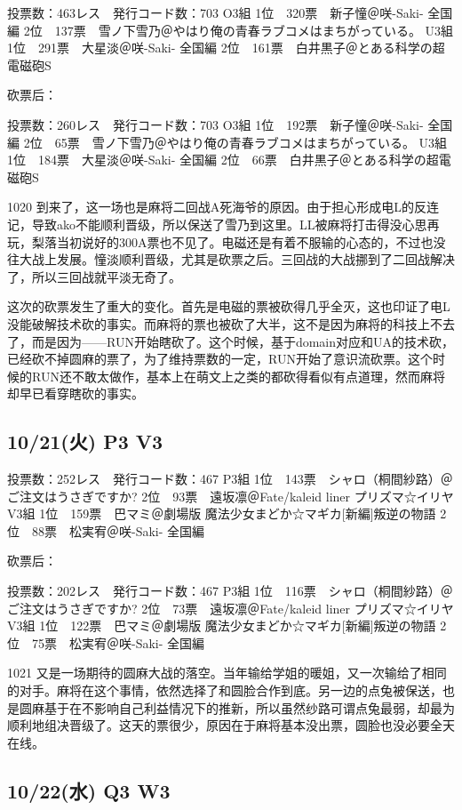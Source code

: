 	投票数：463レス　発行コード数：703
	O3組
	1位　320票　新子憧＠咲-Saki- 全国編
	2位　137票　雪ノ下雪乃＠やはり俺の青春ラブコメはまちがっている。
	U3組
	1位　291票　大星淡＠咲-Saki- 全国編
	2位　161票　白井黒子＠とある科学の超電磁砲S

砍票后：

	投票数：260レス　発行コード数：703
	O3組
	1位　192票　新子憧＠咲-Saki- 全国編
	2位　65票　雪ノ下雪乃＠やはり俺の青春ラブコメはまちがっている。
	U3組
	1位　184票　大星淡＠咲-Saki- 全国編
	2位　66票　白井黒子＠とある科学の超電磁砲S

1020 到来了，这一场也是麻将二回战A死海爷的原因。由于担心形成电L的反连记，导致ako不能顺利晋级，所以保送了雪乃到这里。LL被麻将打击得没心思再玩，梨落当初说好的300A票也不见了。电磁还是有着不服输的心态的，不过也没往大战上发展。憧淡顺利晋级，尤其是砍票之后。三回战的大战挪到了二回战解决了，所以三回战就平淡无奇了。

这次的砍票发生了重大的变化。首先是电磁的票被砍得几乎全灭，这也印证了电L没能破解技术砍的事实。而麻将的票也被砍了大半，这不是因为麻将的科技上不去了，而是因为——RUN开始瞎砍了。这个时候，基于domain对应和UA的技术砍，已经砍不掉圆麻的票了，为了维持票数的一定，RUN开始了意识流砍票。这个时候的RUN还不敢太做作，基本上在萌文上之类的都砍得看似有点道理，然而麻将却早已看穿瞎砍的事实。

\subsection{10/21(火) P3 V3}

	投票数：252レス　発行コード数：467
	P3組
	1位　143票　シャロ（桐間紗路）＠ご注文はうさぎですか?
	2位　93票　遠坂凛＠Fate/kaleid liner プリズマ☆イリヤ
	V3組
	1位　159票　巴マミ＠劇場版 魔法少女まどか☆マギカ[新編]叛逆の物語
	2位　88票　松実宥＠咲-Saki- 全国編

砍票后：

	投票数：202レス　発行コード数：467
	P3組
	1位　116票　シャロ（桐間紗路）＠ご注文はうさぎですか?
	2位　73票　遠坂凛＠Fate/kaleid liner プリズマ☆イリヤ
	V3組
	1位　122票　巴マミ＠劇場版 魔法少女まどか☆マギカ[新編]叛逆の物語
	2位　75票　松実宥＠咲-Saki- 全国編

1021 又是一场期待的圆麻大战的落空。当年输给学姐的暖姐，又一次输给了相同的对手。麻将在这个事情，依然选择了和圆脸合作到底。另一边的点兔被保送，也是圆麻基于在不影响自己利益情况下的推新，所以虽然纱路可谓点兔最弱，却最为顺利地组决晋级了。这天的票很少，原因在于麻将基本没出票，圆脸也没必要全天在线。

\subsection{10/22(水) Q3 W3}

